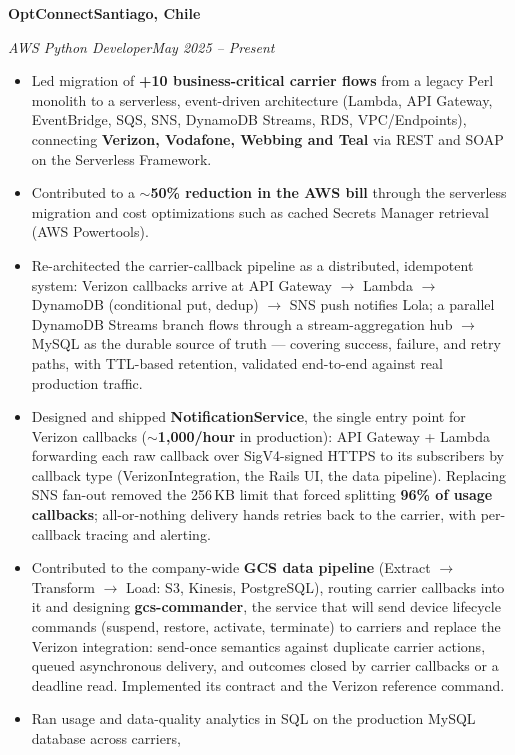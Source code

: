 \documentclass[11pt,a4paper]{article}
\newcommand{\entry}[4]{%
  \textbf{#1}\hfill\textbf{#2}\par
  \textit{#3}\hfill\textit{#4}\par\vspace{2pt}%
}
\begin{document}
\entry{OptConnect}{Santiago, Chile}{AWS Python Developer}{May 2025 -- Present}
\begin{itemize}
  \item Led migration of \textbf{+10 business-critical carrier flows} from a legacy Perl monolith
        to a serverless, event-driven architecture (Lambda, API Gateway, EventBridge, SQS, SNS,
        DynamoDB Streams, RDS, VPC/Endpoints), connecting \textbf{Verizon, Vodafone, Webbing and Teal}
        via REST and SOAP on the Serverless Framework.
  \item Contributed to a \textbf{$\sim$50\% reduction in the AWS bill} through the serverless migration
        and cost optimizations such as cached Secrets Manager retrieval (AWS Powertools).
  \item Re-architected the carrier-callback pipeline as a distributed, idempotent system:
        Verizon callbacks arrive at API Gateway $\to$ Lambda $\to$ DynamoDB (conditional put, dedup)
        $\to$ SNS push notifies Lola; a parallel DynamoDB Streams branch flows through a
        stream-aggregation hub $\to$ MySQL as the durable source of truth --- covering success,
        failure, and retry paths, with TTL-based retention, validated end-to-end against
        real production traffic.
  \item Designed and shipped \textbf{NotificationService}, the single entry point for Verizon
        callbacks ($\sim$\textbf{1,000/hour} in production): API Gateway + Lambda forwarding each raw
        callback over SigV4-signed HTTPS to its subscribers by callback type (VerizonIntegration, the
        Rails UI, the data pipeline). Replacing SNS fan-out removed the 256\,KB limit that forced
        splitting \textbf{96\% of usage callbacks}; all-or-nothing delivery hands retries back to the
        carrier, with per-callback tracing and alerting.
  \item Contributed to the company-wide \textbf{GCS data pipeline} (Extract $\to$ Transform $\to$ Load:
        S3, Kinesis, PostgreSQL), routing carrier callbacks into it and designing
        \textbf{gcs-commander}, the service that will send device lifecycle commands (suspend, restore,
        activate, terminate) to carriers and replace the Verizon integration: send-once semantics
        against duplicate carrier actions, queued asynchronous delivery, and outcomes closed by
        carrier callbacks or a deadline read. Implemented its contract and the Verizon reference command.
  \item Ran usage and data-quality analytics in SQL on the production MySQL database across carriers,

\end{itemize}
\end{document}
